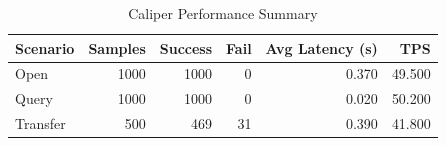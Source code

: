 \begin{table}
\caption{Caliper Performance Summary}
\label{tab:caliper_round}
\begin{tabular}{lrrrrr}
\toprule
Scenario & Samples & Success & Fail & Avg Latency (s) & TPS \\
\midrule
Open & 1000 & 1000 & 0 & 0.370 & 49.500 \\
Query & 1000 & 1000 & 0 & 0.020 & 50.200 \\
Transfer & 500 & 469 & 31 & 0.390 & 41.800 \\
\bottomrule
\end{tabular}
\end{table}
